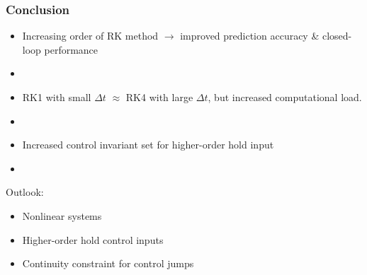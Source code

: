\documentclass[student, noshadow, lsr, english, aspectratio=169]{ITR_LSR_slides}
\begin{document}
\begin{frame}
	\frametitle{Conclusion}
	\begin{itemize}
		\item Increasing order of RK method $\rightarrow$ improved prediction accuracy \& closed-loop performance
		\item[~]  
		\item RK1 with small $\Delta t$ $\approx$ RK4 with large $\Delta t$, but increased computational load.
		\item[~]
		\item Increased control invariant set for higher-order hold input
		\item[~]
	\end{itemize}
\begin{block}{Outlook:}
	\begin{itemize}
	    \item Nonlinear systems
	    \item Higher-order hold control inputs
	    \item Continuity constraint for control jumps
	\end{itemize}
\end{block}
	
\end{frame}

\appendix



\begin{frame}{\LSRITRRefTitle}
	\printbibliography	
\end{frame}
\end{document}
